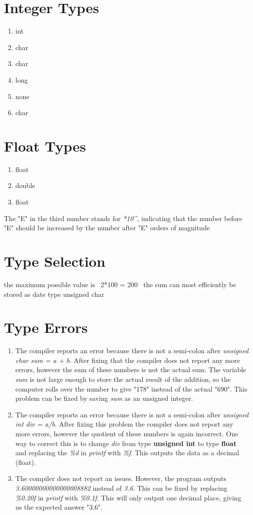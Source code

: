 \documentclass{article}
\begin{document}
\section{Integer Types}
\begin{enumerate}
    \item int
    \item char
    \item char
    \item long
    \item none
    \item char
\end{enumerate}

\section{Float Types}
\begin{enumerate}
    \item float
    \item double
    \item float
\end{enumerate}
The "E" in the third number stands for \textit{*10\textasciicircum}, indicating that the number before "E" should be increased by the number after "E" orders of magnitude

\section{Type Selection}
the maximum possible value is \ 2*100 = 200 \ the sum can most efficiently be stored as date type unsigned char

\section{Type Errors}
\begin{enumerate}
    \item The compiler reports an error because there is not a semi-colon after \textit{unsigned char sum = a + b}. After fixing that the compiler does not report any more errors, however the sum of these numbers is not the actual sum. The variable \textit{sum} is not large enough to store the actual result of the addition, so the computer rolls over the number to give "178" instead of the actual "690". This problem can be fixed by saving \textit{sum} as an unsigned integer.
    \item The compiler reports an error because there is not a semi-colon after \textit{unsigned int div = a/b}. After fixing this problem the compiler does not report any more errors, however the quotient of these numbers is again incorrect. One way to correct this is to change \textit{div} from type \textbf{unsigned int} to type \textbf{float} and replacing the \textit{\%d} in \textit{printf} with \textit{\%f}. This outputs the data as a decimal (float).
    \item The compiler does not report an issues. However, the program outputs \textit{3.60000000000000008882} instead of \textit{3.6}. This can be fixed by replacing \textit{\%0.20f} in \textit{printf} with \textit{\%0.1f}. This will only output one decimal place, giving us the expected answer "3.6".
\end{enumerate}
\end{document}
